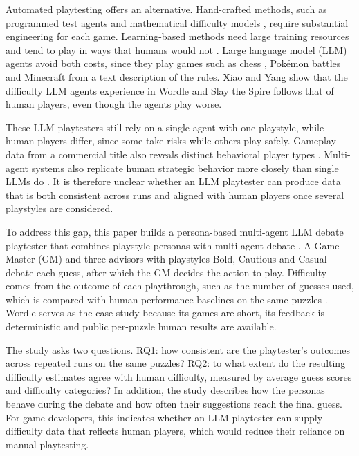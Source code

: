 \documentclass[conference]{IEEEtran}
\begin{document}
Automated playtesting offers an alternative. Hand-crafted methods, such as programmed test agents \cite{prasetya2026} and mathematical difficulty models \cite{francillette2025}, require substantial engineering for each game. Learning-based methods need large training resources and tend to play in ways that humans would not \cite{delfosse2025}. Large language model (LLM) agents avoid both costs, since they play games such as chess \cite{feng2023}, Pok\'emon battles \cite{hu2024} and Minecraft \cite{wang2023} from a text description of the rules. Xiao and Yang \cite{xiao2025} show that the difficulty LLM agents experience in Wordle and Slay the Spire follows that of human players, even though the agents play worse.

These LLM playtesters still rely on a single agent with one playstyle, while human players differ, since some take risks while others play safely. Gameplay data from a commercial title also reveals distinct behavioral player types \cite{drachen2009}. Multi-agent systems also replicate human strategic behavior more closely than single LLMs do \cite{sreedhar2025}. It is therefore unclear whether an LLM playtester can produce data that is both consistent across runs and aligned with human players once several playstyles are considered.

To address this gap, this paper builds a persona-based multi-agent LLM debate playtester that combines playstyle personas \cite{holmgard2019} with multi-agent debate \cite{liang2024}. A Game Master (GM) and three advisors with playstyles Bold, Cautious and Casual debate each guess, after which the GM decides the action to play. Difficulty comes from the outcome of each playthrough, such as the number of guesses used, which is compared with human performance baselines on the same puzzles \cite{constant2017,xiao2025}. Wordle serves as the case study because its games are short, its feedback is deterministic and public per-puzzle human results are available.

The study asks two questions. RQ1: how consistent are the playtester's outcomes across repeated runs on the same puzzles? RQ2: to what extent do the resulting difficulty estimates agree with human difficulty, measured by average guess scores and difficulty categories? In addition, the study describes how the personas behave during the debate and how often their suggestions reach the final guess. For game developers, this indicates whether an LLM playtester can supply difficulty data that reflects human players, which would reduce their reliance on manual playtesting.
\end{document}
